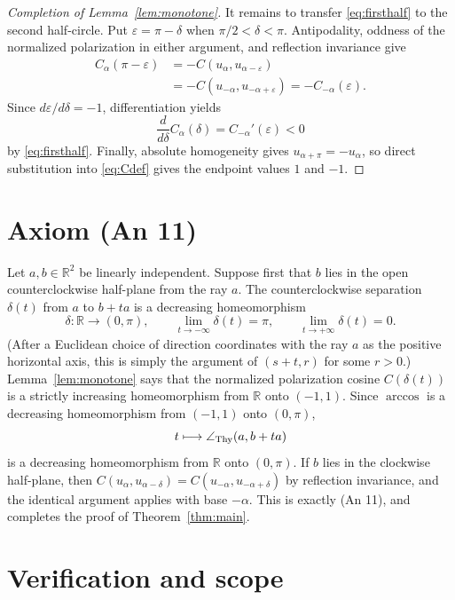 \documentclass[11pt]{article}
\newcommand{\R}{\mathbb R}
\begin{document}
\begin{proof}[Completion of Lemma~\ref{lem:monotone}]
It remains to transfer \eqref{eq:firsthalf} to the second half-circle.  Put
$\varepsilon=\pi-\delta$ when $\pi/2<\delta<\pi$.  Antipodality, oddness of
the normalized polarization in either argument, and reflection invariance
give
\begin{align*}
 C_\alpha(\pi-\varepsilon)
 &=-C(u_\alpha,u_{\alpha-\varepsilon})\\
 &=-C(u_{-\alpha},u_{-\alpha+\varepsilon})
 =-C_{-\alpha}(\varepsilon).
\end{align*}
Since $d\varepsilon/d\delta=-1$, differentiation yields
\[
 \frac{d}{d\delta}C_\alpha(\delta)
 =C_{-\alpha}'(\varepsilon)<0
\]
by \eqref{eq:firsthalf}.  Finally, absolute homogeneity gives
$u_{\alpha+\pi}=-u_\alpha$, so direct substitution into
\eqref{eq:Cdef} gives the endpoint values $1$ and $-1$.
\end{proof}

\section{Axiom (An 11)}

Let $a,b\in\R^2$ be linearly independent.  Suppose first that $b$ lies in the
open counterclockwise half-plane from the ray $a$.  The counterclockwise
separation $\delta(t)$ from $a$ to $b+ta$ is a decreasing homeomorphism
\[
 \delta:\R\longrightarrow(0,\pi),
 \qquad
 \lim_{t\to-\infty}\delta(t)=\pi,\qquad
 \lim_{t\to+\infty}\delta(t)=0.
\]
(After a Euclidean choice of direction coordinates with the ray $a$ as the
positive horizontal axis, this is simply the argument of $(s+t,r)$ for some
$r>0$.)  Lemma~\ref{lem:monotone} says that the normalized
polarization cosine $C(\delta(t))$ is a strictly increasing homeomorphism
from $\R$ onto $(-1,1)$.  Since $\arccos$ is a decreasing homeomorphism from
$(-1,1)$ onto $(0,\pi)$,
\[
 t\longmapsto\angle_{\rm Thy}(a,b+ta)
\]
is a decreasing homeomorphism from $\R$ onto $(0,\pi)$.  If $b$ lies in the
clockwise half-plane, then
$C(u_\alpha,u_{\alpha-\delta})=C(u_{-\alpha},u_{-\alpha+\delta})$
by reflection invariance, and the identical argument applies with base
$-\alpha$.  This is exactly (An 11), and completes the proof of
Theorem~\ref{thm:main}.

\section{Verification and scope}
\end{document}
